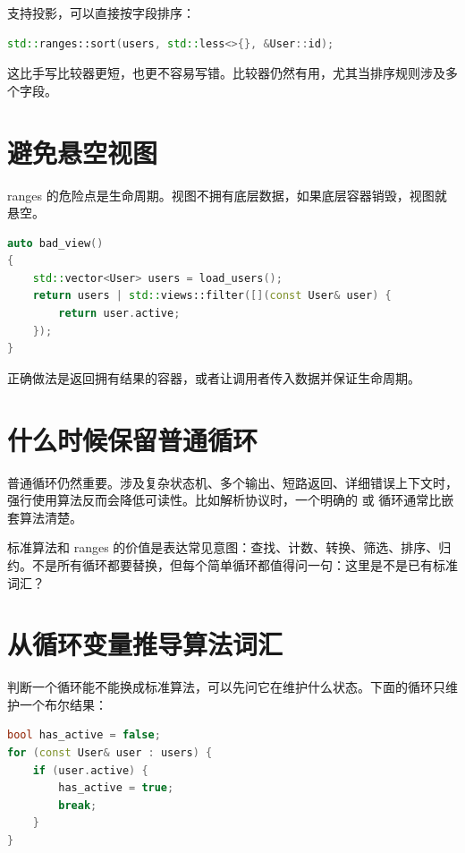  支持投影，可以直接按字段排序：

\begin{lstlisting}[language=C++,caption={按字段排序}]
std::ranges::sort(users, std::less<>{}, &User::id);
\end{lstlisting}

这比手写比较器更短，也更不容易写错。比较器仍然有用，尤其当排序规则涉及多个字段。

\section{避免悬空视图}

ranges 的危险点是生命周期。视图不拥有底层数据，如果底层容器销毁，视图就悬空。

\begin{lstlisting}[language=C++,caption={不要返回依赖局部容器的视图}]
auto bad_view()
{
    std::vector<User> users = load_users();
    return users | std::views::filter([](const User& user) {
        return user.active;
    });
}
\end{lstlisting}

正确做法是返回拥有结果的容器，或者让调用者传入数据并保证生命周期。

\section{什么时候保留普通循环}

普通循环仍然重要。涉及复杂状态机、多个输出、短路返回、详细错误上下文时，强行使用算法反而会降低可读性。比如解析协议时，一个明确的  或  循环通常比嵌套算法清楚。

\begin{keyidea}
标准算法和 ranges 的价值是表达常见意图：查找、计数、转换、筛选、排序、归约。不是所有循环都要替换，但每个简单循环都值得问一句：这里是不是已有标准词汇？
\end{keyidea}

\section{从循环变量推导算法词汇}

判断一个循环能不能换成标准算法，可以先问它在维护什么状态。下面的循环只维护一个布尔结果：

\begin{lstlisting}[language=C++,caption={手写检查是否存在活跃用户}]
bool has_active = false;
for (const User& user : users) {
    if (user.active) {
        has_active = true;
        break;
    }
}
\end{lstlisting}

